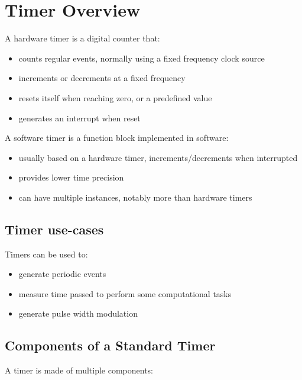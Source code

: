 \chapter{Timer Overview }

A hardware timer is a digital counter that:

\begin{itemize}
    \item counts regular events, normally using a fixed frequency clock source
    \item increments or decrements at a fixed frequency
    \item resets itself when reaching zero, or a predefined value
    \item generates an interrupt when reset
\end{itemize}

A software timer is a function block implemented in software:

\begin{itemize}
    \item usually based on a hardware timer, increments/decrements when interrupted
    \item provides lower time precision
    \item can have multiple instances, notably more than hardware timers
\end{itemize}


\section{Timer use-cases}

Timers can be used to:

\begin{itemize}
    \item[] generate periodic events
    \item[] measure time passed to perform some computational tasks
    \item[] generate pulse width modulation
\end{itemize}

\section{Components of a Standard Timer}

A timer is made of multiple components:

